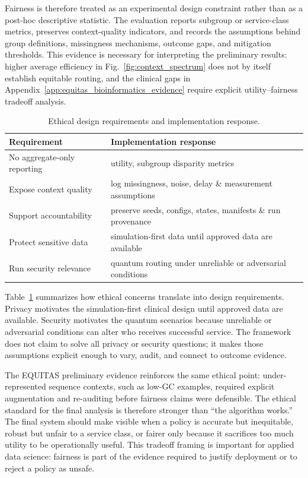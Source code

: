 \documentclass[conference]{IEEEtran}
\begin{document}
Fairness is therefore treated as an experimental design constraint rather than
as a post-hoc descriptive statistic. The evaluation reports subgroup or
service-class metrics, preserves context-quality indicators, and records the
assumptions behind group definitions, missingness mechanisms, outcome gaps,
and mitigation thresholds. This evidence is necessary for interpreting the
preliminary results: higher average efficiency in Fig.~\ref{fig:context_spectrum}
does not by itself establish equitable routing, and the clinical gaps in
Appendix~\ref{app:equitas_bioinformatics_evidence} require explicit
utility--fairness tradeoff analysis.

\begin{table}[t]
\caption{Ethical design requirements and implementation response.}
\label{tab:ethics}
\centering
\small
\begin{tabular}{p{}p{}}
\toprule
\textbf{Requirement} & \textbf{Implementation response} \\
\midrule
No aggregate-only reporting & utility, subgroup disparity metrics \\
Expose context quality & log missingness, noise, delay \& measurement assumptions \\
Support accountability & preserve seeds, configs, states, manifests \& run provenance \\
Protect sensitive data & simulation-first data until approved data are available \\
Run security relevance & quantum routing under unreliable or adversarial conditions \\
\bottomrule
\end{tabular}
\end{table}

Table~\ref{tab:ethics} summarizes how ethical concerns translate into design
requirements. Privacy motivates the simulation-first clinical design until
approved data are available. Security motivates the quantum scenarios because
unreliable or adversarial conditions can alter who receives successful
service. The framework does not claim to solve all privacy or security
questions; it makes those assumptions explicit enough to vary, audit, and
connect to outcome evidence.

The EQUITAS preliminary evidence reinforces the same ethical point:
under-represented sequence contexts, such as low-GC examples, required explicit
augmentation and re-auditing before fairness claims were defensible. The ethical
standard for the final analysis is therefore stronger than ``the algorithm works.''
The final system should make visible when a policy is accurate but inequitable,
robust but unfair to a service class, or fairer only because it sacrifices too
much utility to be operationally useful. This tradeoff framing is important for
applied data science: fairness is part of the
evidence required to justify deployment or to reject a policy as unsafe.
\end{document}
